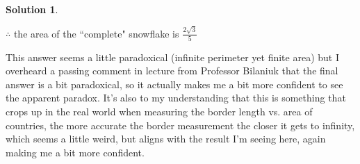 \documentclass[10pt]{article}
\theoremstyle{definition}
\newtheorem{soln}{Solution}
\begin{document}
\begin{soln}
    \begin{center}
        $\therefore$ the area of the ``complete" snowflake is $\frac{2\sqrt{3}}{5}$
    \end{center}
    \noindent This answer seems a little paradoxical (infinite perimeter yet finite area) but I overheard a passing comment in lecture from Professor
    Bilaniuk that the final answer is a bit paradoxical, so it actually makes me a bit more confident to see the apparent paradox. It's also to my understanding that this is something that crops
    up in the real world when measuring the border length vs. area of countries, the more accurate the border measurement the closer it gets to infinity, which seems a little weird, but aligns with
    the result I'm seeing here, again making me a bit more confident.
\end{soln}
\end{document}
